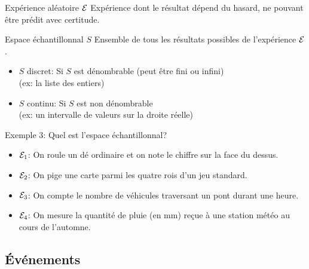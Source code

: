 \documentclass{BeamerTemplate}
\begin{document}
\begin{frame}[t]%

 \begin{Boite}{Expérience aléatoire $\cal{E}$}
Expérience dont le résultat dépend du hasard, ne pouvant  être prédit avec certitude.
\end{Boite}

 \begin{Boite}{Espace échantillonnal $S$}
Ensemble de tous les résultats possibles de l'expérience ${\cal{E}}$.
\end{Boite}


 \medskip
\begin{itemize}
\item \alert{$S$ discret}:
 Si $S$ est dénombrable (peut être fini ou infini) \\(ex: la liste des entiers)

\item \alert{$S$ continu}:
 Si $S$ est  non dénombrable \\(ex: un intervalle de valeurs sur la droite réelle)
 \end{itemize}


\end{frame}

\begin{frame}[t]{Exemple 3: Quel est l'espace échantillonnal?}

 \begin{itemize}\itemsep 10mm
  \item<1-> ${\cal{E}}_1$: On roule un dé ordinaire et on note le chiffre sur la
  face du dessus.%
  \item<1-> ${\cal{E}}_2$: On pige une carte parmi les quatre rois d'un jeu standard.
  \item<1-> ${\cal{E}}_3$: On compte le nombre de véhicules traversant un pont durant
  une heure. %
  \item<1-> ${\cal{E}}_4$: On mesure la quantité de pluie (en mm) reçue à une station
  météo au cours de l'automne. %
 \end{itemize}
\end{frame}

\subsection{Événements}
\end{document}

